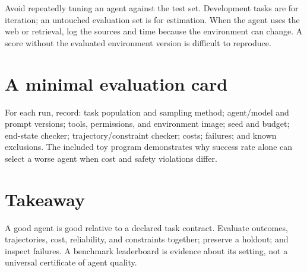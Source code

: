 \documentclass[11pt]{article}
\begin{document}
Avoid repeatedly tuning an agent against the test set. Development tasks are for iteration; an untouched evaluation set is for estimation. When the agent uses the web or retrieval, log the sources and time because the environment can change. A score without the evaluated environment version is difficult to reproduce.

\section{A minimal evaluation card}
For each run, record: task population and sampling method; agent/model and prompt versions; tools, permissions, and environment image; seed and budget; end-state checker; trajectory/constraint checker; costs; failures; and known exclusions. The included toy program demonstrates why success rate alone can select a worse agent when cost and safety violations differ.

\section{Takeaway}
A good agent is good relative to a declared task contract. Evaluate outcomes, trajectories, cost, reliability, and constraints together; preserve a holdout; and inspect failures. A benchmark leaderboard is evidence about its setting, not a universal certificate of agent quality.

\end{document}
